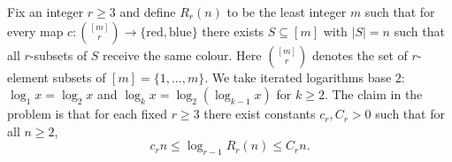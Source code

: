 Fix an integer $r\ge 3$ and define $R_r(n)$ to be the least integer $m$ such that for every map
$c:\binom{[m]}{r}\to\{\text{red},\text{blue}\}$ there exists $S\subseteq[m]$ with $|S|=n$ such that all $r$-subsets of $S$ receive the same colour.
Here $\binom{[m]}{r}$ denotes the set of $r$-element subsets of $[m]=\{1,\dots,m\}$. We take iterated logarithms base $2$:
$\log_1 x = \log_2 x$ and $\log_k x = \log_2(\log_{k-1} x)$ for $k\ge 2$.
The claim in the problem is that for each fixed $r\ge 3$ there exist constants $c_r,C_r>0$ such that for all $n\ge 2$,
\[
 c_r n \le \log_{r-1} R_r(n) \le C_r n.
\]

